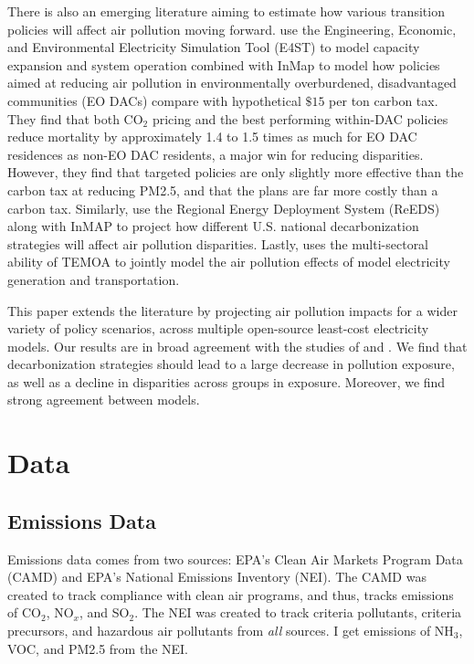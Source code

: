 \documentclass[a4paper]{article}
\theoremstyle{definition}
\theoremstyle{plain}
\begin{document}
There is also an emerging literature aiming to estimate how various transition policies will affect air pollution moving forward.  \citet{Shawhan2024PoliciesAmericans} use the  Engineering, Economic, and Environmental Electricity Simulation Tool (E4ST) to model capacity expansion and system operation combined with InMap to model how policies aimed at reducing air pollution in environmentally overburdened, disadvantaged communities (EO DACs) compare with hypothetical $\$15$ per ton carbon tax.  They find that both CO$_2$ pricing and the best performing within-DAC policies reduce mortality by approximately 1.4 to 1.5 times as much for EO DAC residences as non-EO DAC residents, a major win for reducing disparities.  However, they find that targeted policies are only slightly more effective than the carbon tax at reducing PM2.5, and that the plans are far more costly than a carbon tax.  Similarly, \citet{Goforth2022AirStrategies} use the Regional Energy Deployment System (ReEDS) along with InMAP to project how different U.S. national decarbonization strategies will affect air pollution disparities.  Lastly, \citet{Jordan2024ClimateGeneration} uses the multi-sectoral ability of TEMOA to jointly model the air pollution effects of model electricity generation and transportation.  

This paper extends the literature by projecting air pollution impacts for a wider variety of policy scenarios, across multiple open-source least-cost electricity models.  Our results are in broad agreement with the studies of \citet{Goforth2022AirStrategies} and \citet{Shawhan2024PoliciesAmericans}.  We find that decarbonization strategies should lead to a large decrease in pollution exposure, as well as  a decline in disparities across groups in exposure.  Moreover, we find strong agreement between models.



\section{Data}

\subsection{Emissions Data}
Emissions data comes from two sources: EPA's Clean Air Markets Program Data (CAMD) and EPA's National Emissions Inventory (NEI).  The CAMD was created to track compliance with clean air programs, and thus, tracks emissions of CO$_2$, NO$_x$, and SO$_2$.  The NEI was created to track criteria pollutants, criteria precursors, and hazardous air pollutants from \textit{all} sources.  I get emissions of NH$_3$, VOC, and PM2.5 from the NEI. 
\end{document}
